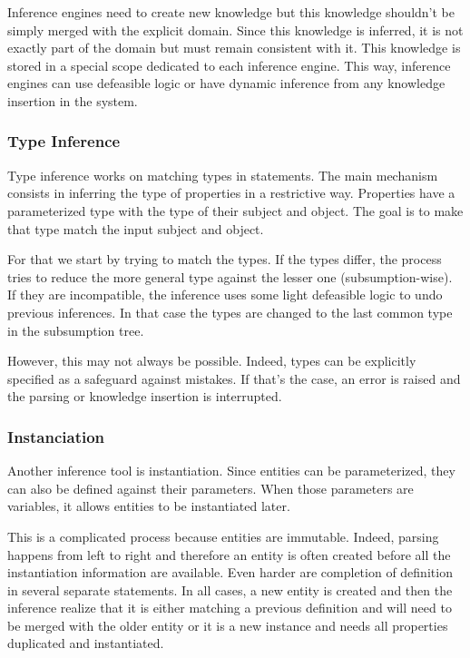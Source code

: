\documentclass[11pt,a4paper,twoside,openright,titlepage,numbers=noenddot,headinclude,cleardoublepage=empty,openany]{scrreprt}
\theoremstyle{plain}
\theoremstyle{definition}
\theoremstyle{remark}
\begin{document}
Inference engines need to create new knowledge but this knowledge
shouldn't be simply merged with the explicit domain. Since this
knowledge is inferred, it is not exactly part of the domain but must
remain consistent with it. This knowledge is stored in a special scope
dedicated to each inference engine. This way, inference engines can use
defeasible logic or have dynamic inference from any knowledge insertion
in the system.

\hypertarget{type-inference}{%
\subsubsection{Type Inference}\label{type-inference}}

Type inference works on matching types in statements. The main mechanism
consists in inferring the type of properties in a restrictive way.
Properties have a parameterized type with the type of their subject and
object. The goal is to make that type match the input subject and
object.

For that we start by trying to match the types. If the types differ, the
process tries to reduce the more general type against the lesser one
(subsumption-wise). If they are incompatible, the inference uses some
light defeasible logic to undo previous inferences. In that case the
types are changed to the last common type in the subsumption tree.

However, this may not always be possible. Indeed, types can be
explicitly specified as a safeguard against mistakes. If that's the
case, an error is raised and the parsing or knowledge insertion is
interrupted.

\hypertarget{instanciation}{%
\subsubsection{Instanciation}\label{instanciation}}

Another inference tool is instantiation. Since entities can be
parameterized, they can also be defined against their parameters. When
those parameters are variables, it allows entities to be instantiated
later.

This is a complicated process because entities are immutable. Indeed,
parsing happens from left to right and therefore an entity is often
created before all the instantiation information are available. Even
harder are completion of definition in several separate statements. In
all cases, a new entity is created and then the inference realize that
it is either matching a previous definition and will need to be merged
with the older entity or it is a new instance and needs all properties
duplicated and instantiated.
\end{document}
